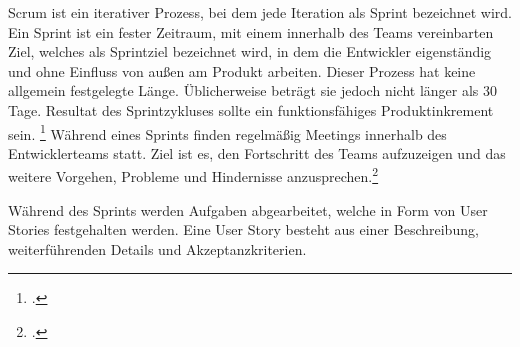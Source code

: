 Scrum ist ein iterativer Prozess, bei dem jede Iteration als Sprint bezeichnet wird. Ein Sprint ist ein fester Zeitraum, mit einem innerhalb des Teams vereinbarten Ziel, welches als Sprintziel bezeichnet wird, in dem die Entwickler eigenständig und ohne Einfluss von außen am Produkt arbeiten. Dieser Prozess hat keine allgemein festgelegte Länge. Üblicherweise beträgt sie jedoch nicht länger als 30 Tage. Resultat des Sprintzykluses sollte ein funktionsfähiges Produktinkrement sein. \footcite[Seite 13]{Brandstäter2013} Während eines Sprints finden regelmäßig Meetings innerhalb des Entwicklerteams statt. Ziel ist es, den Fortschritt des Teams aufzuzeigen und das weitere Vorgehen, Probleme und Hindernisse anzusprechen.\footcite[Seite 14]{Brandstäter2013}

Während des Sprints werden Aufgaben abgearbeitet, welche in Form von User Stories festgehalten werden. Eine User Story besteht aus einer Beschreibung, weiterführenden Details und Akzeptanzkriterien.

